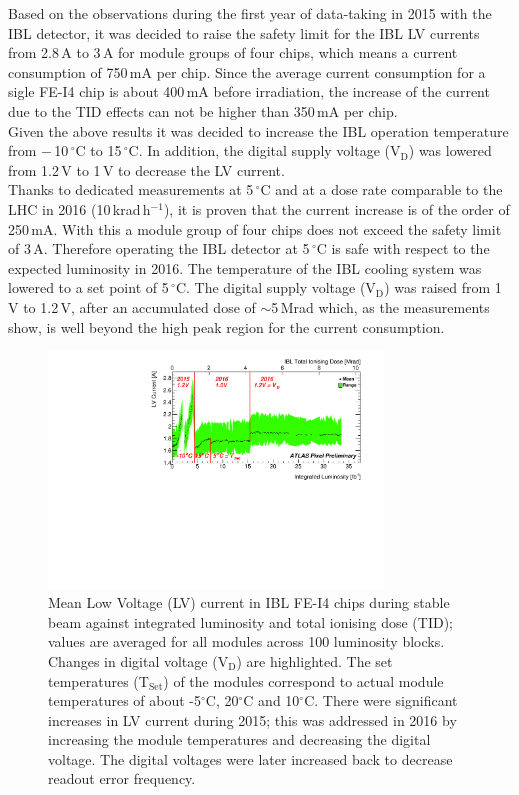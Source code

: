 Based on the observations during the first year of data-taking in 2015 with the IBL detector, it was decided to raise the safety limit for the IBL LV currents from 2.8\,A to 3\,A for module groups of four chips, which means a current consumption of 750\,${\mathrm{mA}}$ per chip. 
Since the average current consumption for a sigle FE-I4 chip  is about 400\,${\mathrm{mA}}$ before irradiation, the increase of the current due to the TID effects can not be higher than 350\,${\mathrm{mA}}$ per chip.\\
Given the above results it was decided to increase the IBL operation temperature from $-$\,10\,$^\circ$C to 15\,$^\circ$C. 
In addition,  the digital supply voltage (V$_{\mathrm{D}}$) was lowered from 1.2\,V to 1\,V to decrease the LV current. \\
Thanks to dedicated measurements at 5\,$^\circ$C and at a dose rate comparable to the LHC in 2016 (10\,krad\,h$^{-1}$), it is proven that the current increase is of the order of 250\,${\mathrm{mA}}$. With this a module group of four chips does not exceed the safety limit of 3\,A. Therefore operating the IBL detector at 5\,$^\circ$C is safe with respect to the expected luminosity in 2016. 
The temperature of the IBL cooling system was lowered to a set point of 5\,$^\circ$C. The digital  supply voltage (V$_{\mathrm{D}}$) was raised from 1\,V to 1.2\,V, after an accumulated dose of $\sim$5\,Mrad which, as the measurements show, is well beyond the high peak region for the current consumption. \\
\begin{figure}[h!]
\centering
\includegraphics[width=3.5in]{figures/ElectronicsChapter/ATLAS/LV_vs_Lint_vs_TID.pdf}
\caption{Mean Low Voltage (LV) current in IBL FE-I4 chips during stable beam against integrated luminosity and total ionising dose (TID); values are averaged for all modules across 100 luminosity blocks. Changes in digital voltage (V$_{\mathrm{D}}$) are highlighted. The set temperatures (T$_{\mathrm{Set}}$) of the modules correspond to actual module temperatures of about -5$^\circ$C, 20$^\circ$C and 10$^\circ$C. There were significant increases in LV current during 2015; this was addressed in 2016 by increasing the module temperatures and decreasing the digital voltage. The digital voltages were later increased back to decrease readout error frequency.}
\label{fig:LV_vs_Lint_vs_TID}
\end{figure} 
